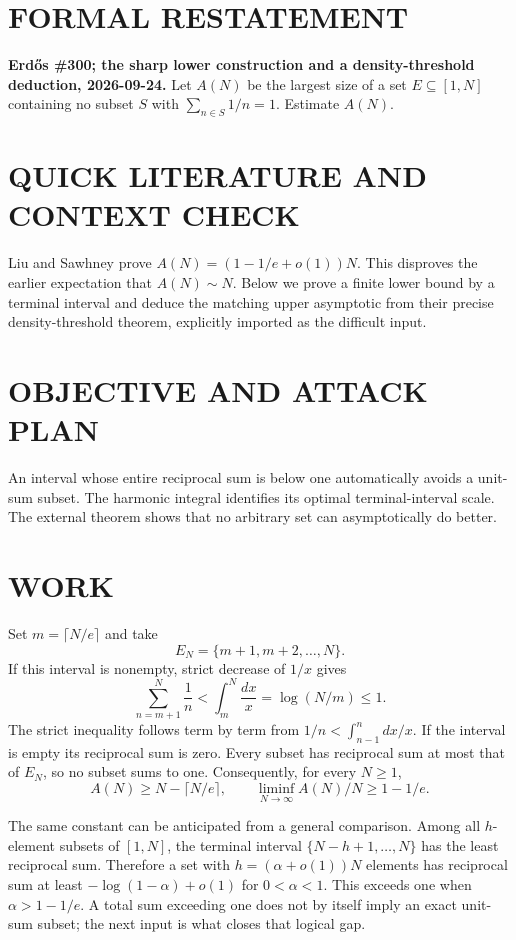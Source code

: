\section{FORMAL RESTATEMENT}
\textbf{Erd\H{o}s \#300; the sharp lower construction and a density-threshold deduction, 2026-09-24.}
Let $A(N)$ be the largest size of a set $E\subseteq[1,N]$ containing no subset $S$ with $\sum_{n\in S}1/n=1$. Estimate $A(N)$.

\section{QUICK LITERATURE AND CONTEXT CHECK}
Liu and Sawhney prove $A(N)=(1-1/e+o(1))N$. This disproves the earlier expectation that $A(N)\sim N$. Below we prove a finite lower bound by a terminal interval and deduce the matching upper asymptotic from their precise density-threshold theorem, explicitly imported as the difficult input.

\section{OBJECTIVE AND ATTACK PLAN}
An interval whose entire reciprocal sum is below one automatically avoids a unit-sum subset. The harmonic integral identifies its optimal terminal-interval scale. The external theorem shows that no arbitrary set can asymptotically do better.

\section{WORK}
Set $m=\lceil N/e\rceil$ and take
\[
E_N=\{m+1,m+2,\ldots,N\}.
\]
If this interval is nonempty, strict decrease of $1/x$ gives
\[
\sum_{n=m+1}^N\frac1n
<\int_m^N\frac{dx}{x}
=\log(N/m)\leq1.
\tag{1}
\]
The strict inequality follows term by term from $1/n<\int_{n-1}^n dx/x$. If the interval is empty its reciprocal sum is zero. Every subset has reciprocal sum at most that of $E_N$, so no subset sums to one. Consequently, for every $N\geq1$,
\[
A(N)\geq N-\lceil N/e\rceil,
\qquad
\liminf_{N\to\infty}A(N)/N\geq1-1/e.
\tag{2}
\]

The same constant can be anticipated from a general comparison. Among all $h$-element subsets of $[1,N]$, the terminal interval $\{N-h+1,\ldots,N\}$ has the least reciprocal sum. Therefore a set with $h=(\alpha+o(1))N$ elements has reciprocal sum at least $-\log(1-\alpha)+o(1)$ for $0<\alpha<1$. This exceeds one when $\alpha>1-1/e$. A total sum exceeding one does not by itself imply an exact unit-sum subset; the next input is what closes that logical gap.

